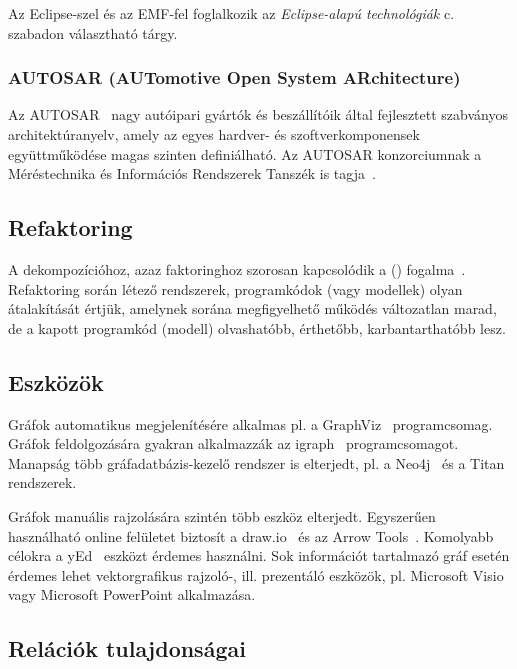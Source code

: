 Az Eclipse-szel és az EMF-fel foglalkozik az \emph{Eclipse-alapú technológiák} c. szabadon választható tárgy.

\subsubsection{AUTOSAR (AUTomotive Open System ARchitecture)}

Az AUTOSAR~\cite{autosar} nagy autóipari gyártók és beszállítóik által fejlesztett szabványos architektúranyelv, amely az egyes hardver- és szoftverkomponensek együttműködése magas szinten definiálható. Az AUTOSAR konzorciumnak a Méréstechnika és Információs Rendszerek Tanszék is tagja~\cite{autosar-attendees}.

\subsection{Refaktoring}

A dekompozícióhoz, azaz faktoringhoz szorosan kapcsolódik a  () fogalma~\cite{fowler2012refactoring}. Refaktoring során létező rendszerek, programkódok (vagy modellek) olyan átalakítását értjük, amelynek sorána megfigyelhető működés változatlan marad, de a kapott programkód (modell) olvashatóbb, érthetőbb, karbantarthatóbb lesz.

\subsection{Eszközök}

Gráfok automatikus megjelenítésére alkalmas pl. a GraphViz~\cite{graphviz} programcsomag. Gráfok feldolgozására gyakran alkalmazzák az igraph~\cite{igraph} programcsomagot. Manapság több gráfadatbázis-kezelő rendszer is elterjedt, pl. a Neo4j~\cite{Neo4j} és a Titan~\cite{Titan} rendszerek.

Gráfok manuális rajzolására szintén több eszköz elterjedt. Egyszerűen használható online felületet biztosít a draw.io~\cite{drawio} és az Arrow Tools~\cite{arrowtool}. Komolyabb célokra a yEd~\cite{yed} eszközt érdemes használni. Sok információt tartalmazó gráf esetén érdemes lehet vektorgrafikus rajzoló-, ill. prezentáló eszközök, pl. Microsoft Visio vagy Microsoft PowerPoint alkalmazása.
%
\subsection{Relációk tulajdonságai}

